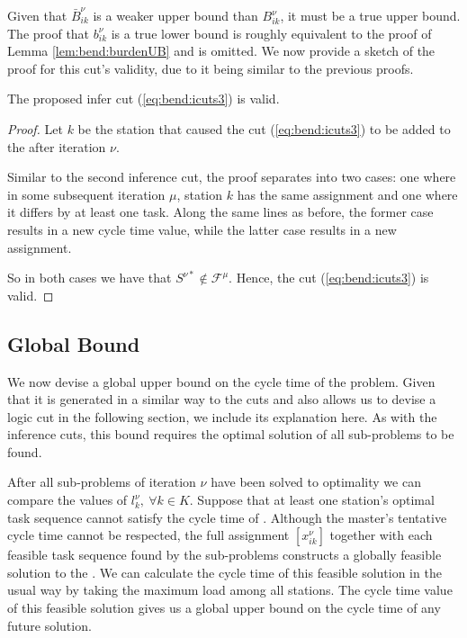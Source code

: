 Given that $\bar{B}_{ik}^\nu$ is a weaker upper bound than $B_{ik}^\nu$, 
it must be a true upper bound.
The proof that $b_{ik}^\nu$ is a true lower bound is roughly equivalent to
the proof of Lemma \ref{lem:bend:burdenUB} and is omitted.
We now provide a sketch of the proof for this cut's validity,
due to it being similar to the previous proofs.

\begin{theorem}
	The proposed infer cut (\ref{eq:bend:icuts3}) is valid.
\end{theorem}
\begin{proof}
	Let $k$ be the station that caused the cut (\ref{eq:bend:icuts3})
	to be added to the \rmp{} after iteration $\nu$.

	Similar to the second inference cut,
	the proof separates into two cases: one
	where in some subsequent iteration $\mu$,
	station $k$ has the same assignment and one
	where it differs by at least one task.
	Along the same lines as before, the former case
	results in a new cycle time value, while
	the latter case results in a new assignment.

	So in both cases we have that
	$S^{\nu*}\not\in \mathcal{F}^\mu$.
	Hence, the cut (\ref{eq:bend:icuts3}) is valid.
\end{proof}

\subsection{Global Bound}
\label{sec:bend:GBcuts}
We now devise a global upper bound on the cycle time of 
the problem.
Given that it is generated in a similar way to
the cuts and also allows us to devise
a logic cut in the following section, we include its explanation here.
As with the inference cuts,
this bound requires the optimal solution
of all sub-problems to be found.

After all sub-problems of iteration $\nu$
have been solved to optimality we can compare
the values of $l_k^\nu,~ \forall k\in K$.
Suppose that at least one station's optimal task
sequence cannot satisfy the
cycle time of \rmp{\nu}.
Although the master's tentative cycle time cannot be
respected, the full assignment $[x_{ik}^\nu]$
together with each feasible task sequence found by the sub-problems
constructs a globally feasible solution to the .
We can calculate the cycle time of this feasible solution
in the usual way by taking the maximum load among all
stations.
The cycle time value of this feasible solution
gives us a global upper bound on the cycle time
of any future solution.

